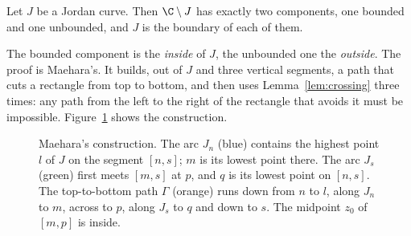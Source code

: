 \begin{theorem}\label{thm:jordan}
Let $J$ be a Jordan curve. Then $\C\setminus J$ has exactly two components, one bounded and one unbounded, and $J$ is the boundary of each of them.
\end{theorem}

The bounded component is the \emph{inside} of $J$, the unbounded one the \emph{outside}. The proof is Maehara's. It builds, out of $J$ and three vertical segments, a path that cuts a
rectangle from top to bottom, and then uses Lemma~\ref{lem:crossing} three times: any path from the left to the right of the rectangle that avoids it must be impossible. Figure~\ref{fig:jordan}
shows the construction.

\begin{figure}[ht]
\centering
{}
\caption{Maehara's construction. The arc $J_n$ (blue) contains the highest point $l$ of $J$ on the segment $[n,s]$; $m$ is its lowest point there. The arc $J_s$ (green) first meets $[m,s]$ at
$p$, and $q$ is its lowest point on $[n,s]$. The top-to-bottom path $\Gamma$ (orange) runs down from $n$ to $l$, along $J_n$ to $m$, across to $p$, along $J_s$ to $q$ and down to $s$. The
midpoint $z_0$ of $[m,p]$ is inside.}
\label{fig:jordan}
\end{figure}

